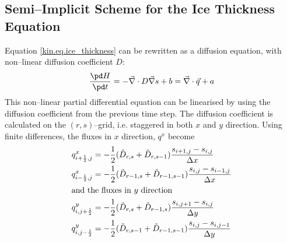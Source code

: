 \subsection{Semi--Implicit Scheme for the Ice Thickness Equation}
Equation \eqref{kin.eq.ice_thickness} can be rewritten as a diffusion equation, with non--linear diffusion coefficient $D$:
\begin{equation}
  \label{kin.eq.ice_evo}
  \frac{\pd H}{\pd t}=-\vec\nabla\cdot D\vec\nabla s+b=\vec\nabla\cdot\vec q+a
\end{equation}
This non--linear partial differential equation can be linearised by using the diffusion coefficient from the previous time step. The diffusion coefficient is calculated on the $(r,s)$--grid, i.e. staggered in both $x$ and $y$ direction. Using finite differences, the fluxes in $x$ direction, $q^x$ become
\begin{subequations}
\begin{align}
  q^x_{i+\frac12,j}&=-\frac12(\tilde{D}_{r,s}+\tilde{D}_{r,s-1})\frac{s_{i+1,j}-s_{i,j}}{\Delta x}\\
  q^x_{i-\frac12,j}&=-\frac12(\tilde{D}_{r-1,s}+\tilde{D}_{r-1,s-1})\frac{s_{i,j}-s_{i-1,j}}{\Delta x}\\
  \intertext{and the fluxes in $y$ direction}
  q^y_{i,j+\frac12}&=-\frac12(\tilde{D}_{r,s}+\tilde{D}_{r-1,s})\frac{s_{i,j+1}-s_{i,j}}{\Delta y}\\
  q^y_{i,j-\frac12}&=-\frac12(\tilde{D}_{r,s-1}+\tilde{D}_{r-1,s-1})\frac{s_{i,j}-s_{i,j-1}}{\Delta y}
\end{align}  
\end{subequations}

